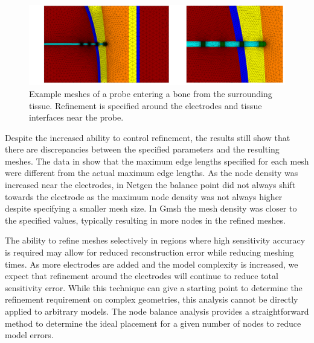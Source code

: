 \begin{figure}[H]
  \includegraphics[width=\columnwidth]{chapter4-mesh_refinement/imgs/advanced_mesh_combined.pdf}
    \caption[Advanced mesh example of an internal probe]{\label{fig:adv_mesh} Example 
    meshes of a probe entering a bone from the surrounding 
    tissue. Refinement is specified around the electrodes and tissue interfaces near the probe.}
\end{figure}

Despite the increased ability to control refinement, the results still show that there are
discrepancies between the specified parameters and the resulting meshes. The data in 
 show that the maximum edge lengths specified for each mesh 
were different from the actual maximum edge lengths. As the node density was increased
near the electrodes, in Netgen the balance point did not always shift towards the electrode
as the maximum node density was not always higher despite specifying a smaller mesh size.
In Gmsh the mesh density was closer to the specified values, typically resulting in more
nodes in the refined meshes. 

The ability to refine meshes selectively in regions where high sensitivity accuracy
is required may allow for reduced reconstruction error while reducing 
meshing times.
As more electrodes are added and the model complexity is increased, we expect that 
refinement around the electrodes will continue to reduce total sensitivity error. 
While this technique can give a starting point to determine the refinement requirement 
on complex geometries, this analysis cannot be directly applied to arbitrary models. 
The node balance analysis provides a straightforward method to determine the 
ideal placement for a given number of nodes to reduce model errors.


